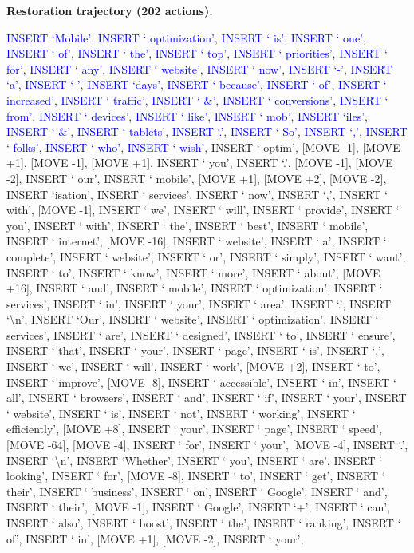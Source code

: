 \documentclass[11pt]{article}
\begin{document}
\vspace{0.4em}
\textbf{Restoration trajectory (202 actions).}\par
{
\ttfamily\scriptsize\raggedright\setlength{\parindent}{0pt}
\textcolor{blue}{INSERT `Mobile'}, \textcolor{blue}{INSERT ` optimization'}, \textcolor{blue}{INSERT ` is'}, \textcolor{blue}{INSERT ` one'}, \textcolor{blue}{INSERT ` of'}, \textcolor{blue}{INSERT ` the'}, \textcolor{blue}{INSERT ` top'}, \textcolor{blue}{INSERT ` priorities'}, \textcolor{blue}{INSERT ` for'}, \textcolor{blue}{INSERT ` any'}, \textcolor{blue}{INSERT ` website'}, \textcolor{blue}{INSERT ` now'}, \textcolor{blue}{INSERT `-'}, \textcolor{blue}{INSERT `a'}, \textcolor{blue}{INSERT `-'}, \textcolor{blue}{INSERT `days'}, \textcolor{blue}{INSERT ` because'}, \textcolor{blue}{INSERT ` of'}, \textcolor{blue}{INSERT ` increased'}, \textcolor{blue}{INSERT ` traffic'}, \textcolor{blue}{INSERT ` \&'}, \textcolor{blue}{INSERT ` conversions'}, \textcolor{blue}{INSERT ` from'}, \textcolor{blue}{INSERT ` devices'}, \textcolor{blue}{INSERT ` like'}, \textcolor{blue}{INSERT ` mob'}, \textcolor{blue}{INSERT `iles'}, \textcolor{blue}{INSERT ` \&'}, \textcolor{blue}{INSERT ` tablets'}, \textcolor{blue}{INSERT `.'}, \textcolor{blue}{INSERT ` So'}, \textcolor{blue}{INSERT `,'}, \textcolor{blue}{INSERT ` folks'}, \textcolor{blue}{INSERT ` who'}, \textcolor{blue}{INSERT ` wish'}, INSERT ` optim', [MOVE -1], [MOVE +1], [MOVE -1], [MOVE +1], INSERT ` you', INSERT `.', [MOVE -1], [MOVE -2], INSERT ` our', INSERT ` mobile', [MOVE +1], [MOVE +2], [MOVE -2], INSERT `isation', INSERT ` services', INSERT ` now', INSERT `,', INSERT ` with', [MOVE -1], INSERT ` we', INSERT ` will', INSERT ` provide', INSERT ` you', INSERT ` with', INSERT ` the', INSERT ` best', INSERT ` mobile', INSERT ` internet', [MOVE -16], INSERT ` website', INSERT ` a', INSERT ` complete', INSERT ` website', INSERT ` or', INSERT ` simply', INSERT ` want', INSERT ` to', INSERT ` know', INSERT ` more', INSERT ` about', [MOVE +16], INSERT ` and', INSERT ` mobile', INSERT ` optimization', INSERT ` services', INSERT ` in', INSERT ` your', INSERT ` area', INSERT `.', INSERT `\textbackslash{}n', INSERT `Our', INSERT ` website', INSERT ` optimization', INSERT ` services', INSERT ` are', INSERT ` designed', INSERT ` to', INSERT ` ensure', INSERT ` that', INSERT ` your', INSERT ` page', INSERT ` is', INSERT `,', INSERT ` we', INSERT ` will', INSERT ` work', [MOVE +2], INSERT ` to', INSERT ` improve', [MOVE -8], INSERT ` accessible', INSERT ` in', INSERT ` all', INSERT ` browsers', INSERT ` and', INSERT ` if', INSERT ` your', INSERT ` website', INSERT ` is', INSERT ` not', INSERT ` working', INSERT ` efficiently', [MOVE +8], INSERT ` your', INSERT ` page', INSERT ` speed', [MOVE -64], [MOVE -4], INSERT ` for', INSERT ` your', [MOVE -4], INSERT `.', INSERT `\textbackslash{}n', INSERT `Whether', INSERT ` you', INSERT ` are', INSERT ` looking', INSERT ` for', [MOVE -8], INSERT ` to', INSERT ` get', INSERT ` their', INSERT ` business', INSERT ` on', INSERT ` Google', INSERT ` and', INSERT ` their', [MOVE -1], INSERT ` Google', INSERT `+', INSERT ` can', INSERT ` also', INSERT ` boost', INSERT ` the', INSERT ` ranking', INSERT ` of', INSERT ` in', [MOVE +1], [MOVE -2], INSERT ` your', }
\end{document}
